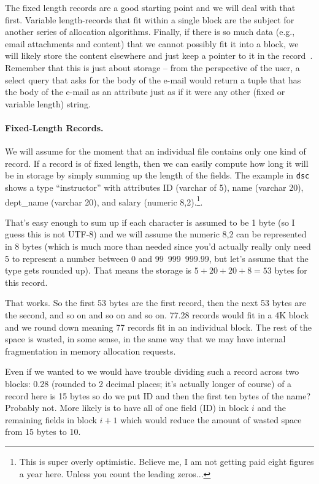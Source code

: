 \documentclass[a4paper]{report}
\begin{document}
The fixed length records are a good starting point and we will deal with that first. Variable length-records that fit within a single block are the subject for another series of allocation algorithms. Finally, if there is so much data (e.g., email attachments and content) that we cannot possibly fit it into a block, we will likely store the content elsewhere and just keep a pointer to it in the record~\cite{dsc}. Remember that this is just about storage -- from the perspective of the user, a select query that asks for the body of the e-mail would return a tuple that has the body of the e-mail as an attribute just as if it were any other (fixed or variable length) string.

\paragraph{Fixed-Length Records.} 

We will assume for the moment that an individual file contains only one kind of record. If a record is of fixed length, then we can easily compute how long it will be in storage by simply summing up the length of the fields. The example in \texttt{dsc} shows a type ``instructor'' with attributes ID (varchar of 5), name (varchar 20), dept\_name (varchar 20), and salary (numeric 8,2).\footnote{This is super overly optimistic. Believe me, I am not getting paid eight figures a year here. Unless you count the leading zeros...}. 

That's easy enough to sum up if each character is assumed to be 1 byte (so I guess this is not UTF-8) and we will assume the numeric 8,2 can be represented in 8 bytes (which is much more than needed since you'd actually really only need 5 to represent a number between 0 and 99~999~999.99, but let's assume that the type gets rounded up). That means the storage is $5 + 20 + 20 + 8 = 53$ bytes for this record. 

That works. So the first 53 bytes are the first record, then the next 53 bytes are the second, and so on and so on and so on. 77.28 records would fit in a 4K block and we round down meaning 77 records fit in an individual block. The rest of the space is wasted, in some sense, in the same way that we may have internal fragmentation in memory allocation requests. 

Even if we wanted to we would have trouble dividing such a record across two blocks: 0.28 (rounded to 2 decimal places; it's actually longer of course) of a record here is 15 bytes so do we put ID and then the first ten bytes of the name? Probably not. More likely is to have all of one field (ID) in block $i$ and the remaining fields in block $i+1$ which would reduce the amount of wasted space from 15 bytes to 10. 
\end{document}
